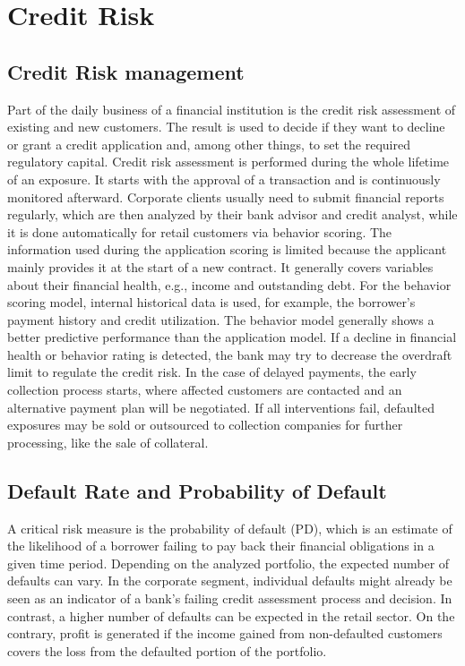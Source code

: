 \chapter{Credit Risk}

\section{Credit Risk management}
Part of the daily business of a financial institution is the credit risk assessment of existing and new customers. The result is used to decide if they want to decline or grant a credit application and, among other things, to set the required regulatory capital. Credit risk assessment is performed during the whole lifetime of an exposure. It starts with the approval of a transaction and is continuously monitored afterward. Corporate clients usually need to submit financial reports regularly, which are then analyzed by their bank advisor and credit analyst, while it is done automatically for retail customers via behavior scoring. The information used during the application scoring is limited because the applicant mainly provides it at the start of a new contract. It generally covers variables about their financial health, e.g., income and outstanding debt. For the behavior scoring model, internal historical data is used, for example, the borrower's payment history and credit utilization. The behavior model generally shows a better predictive performance than the application model. If a decline in financial health or behavior rating is detected, the bank may try to decrease the overdraft limit to regulate the credit risk. In the case of delayed payments, the early collection process starts, where affected customers are contacted and an alternative payment plan will be negotiated. If all interventions fail, defaulted exposures may be sold or outsourced to collection companies for further processing, like the sale of collateral. \cite[p.~7]{Witzany:2017}

\section{Default Rate and Probability of Default}
\label{sec:dr_pd}
A critical risk measure is the probability of default (PD), which is an estimate of the likelihood of a borrower failing to pay back their financial obligations in a given time period. Depending on the analyzed portfolio, the expected number of defaults can vary. In the corporate segment, individual defaults might already be seen as an indicator of a bank's failing credit assessment process and decision. In contrast, a higher number of defaults can be expected in the retail sector. On the contrary, profit is generated if the income gained from non-defaulted customers covers the loss from the defaulted portion of the portfolio. \cite[p.~2]{Witzany:2017}

